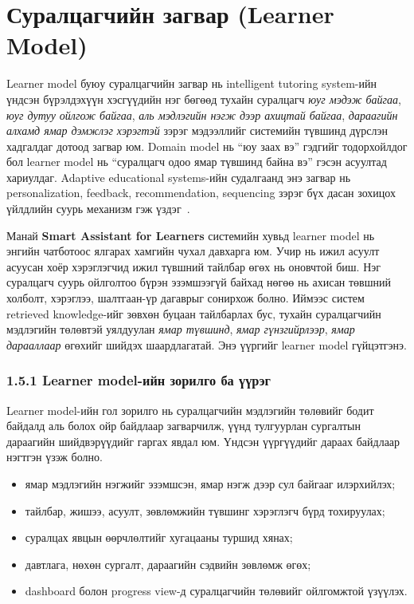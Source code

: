 \documentclass[12pt,A4]{report}
\begin{document}
\section{Суралцагчийн загвар (Learner Model)}

Learner model буюу суралцагчийн загвар нь intelligent tutoring system-ийн үндсэн бүрэлдэхүүн хэсгүүдийн нэг бөгөөд тухайн суралцагч \emph{юуг мэдэж байгаа}, \emph{юуг дутуу ойлгож байгаа}, \emph{аль мэдлэгийн нэгж дээр ахицтай байгаа}, \emph{дараагийн алхамд ямар дэмжлэг хэрэгтэй} зэрэг мэдээллийг системийн түвшинд дүрслэн хадгалдаг дотоод загвар юм. Domain model нь ``юу заах вэ'' гэдгийг тодорхойлдог бол learner model нь ``суралцагч одоо ямар түвшинд байна вэ'' гэсэн асуултад хариулдаг. Adaptive educational systems-ийн судалгаанд энэ загвар нь personalization, feedback, recommendation, sequencing зэрэг бүх дасан зохицох үйлдлийн суурь механизм гэж үздэг~\cite{brusilovsky2007,desmarais2012}.

Манай \textbf{Smart Assistant for Learners} системийн хувьд learner model нь энгийн чатботоос ялгарах хамгийн чухал давхарга юм. Учир нь ижил асуулт асуусан хоёр хэрэглэгчид ижил түвшний тайлбар өгөх нь оновчтой биш. Нэг суралцагч суурь ойлголтоо бүрэн эзэмшээгүй байхад нөгөө нь ахисан төвшний холболт, хэрэглээ, шалтгаан-үр дагаврыг сонирхож болно. Иймээс систем retrieved knowledge-ийг зөвхөн буцаан тайлбарлах бус, тухайн суралцагчийн мэдлэгийн төлөвтэй уялдуулан \emph{ямар түвшинд}, \emph{ямар гүнзгийрлээр}, \emph{ямар дарааллаар} өгөхийг шийдэх шаардлагатай. Энэ үүргийг learner model гүйцэтгэнэ.

\subsubsection{1.5.1 Learner model-ийн зорилго ба үүрэг}

Learner model-ийн гол зорилго нь суралцагчийн мэдлэгийн төлөвийг бодит байдалд аль болох ойр байдлаар загварчилж, үүнд тулгуурлан сургалтын дараагийн шийдвэрүүдийг гаргах явдал юм. Үндсэн үүргүүдийг дараах байдлаар нэгтгэн үзэж болно.

\begin{itemize}
    \item ямар мэдлэгийн нэгжийг эзэмшсэн, ямар нэгж дээр сул байгааг илэрхийлэх;
    \item тайлбар, жишээ, асуулт, зөвлөмжийн түвшинг хэрэглэгч бүрд тохируулах;
    \item суралцах явцын өөрчлөлтийг хугацааны туршид хянах;
    \item давтлага, нөхөн сургалт, дараагийн сэдвийн зөвлөмж өгөх;
    \item dashboard болон progress view-д суралцагчийн төлөвийг ойлгомжтой үзүүлэх.
\end{itemize}
\end{document}

